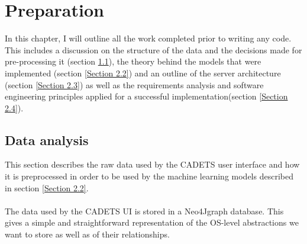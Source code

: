 
	\chapter{Preparation} 
	In this chapter, I will outline all the work completed prior to writing any code. This includes a discussion on the structure of the data and the decisions made for pre-processing it (section \ref{Section 2.1}), the theory behind the models that were implemented (section \ref{Section 2.2}) and an outline of the server architecture (section \ref{Section 2.3}) as well as the requirements analysis and software engineering principles applied for a successful implementation(section \ref{Section 2.4}).
	
	\section{Data analysis} \label{Section 2.1}
	This section describes the raw data used by the CADETS user interface and how it is preprocessed in order to be used by the machine learning models described in section \ref{Section 2.2}.
	\\ \\
	The data used by the CADETS UI is stored in a Neo4J\footnotemark[1] graph database. This gives a simple and straightforward representation of the OS-level abstractions we want to store as well as of their relationships.

	
